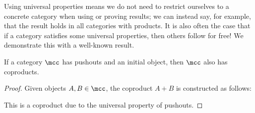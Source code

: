 Using universal properties means we do not need to restrict ourselves to a
concrete category when using or proving results; we can instead say, for
example, that the result holds in all categories with products.
It is also often the case that if a category satisfies some universal
properties, then others follow for free!
We demonstrate this with a well-known result.

\begin{lemma}
    \label{lem:coproducts-pushout}
    If a category \(\mcc\) has pushouts and an initial object, then \(\mcc\)
    also has coproducts.
\end{lemma}
\begin{proof}
    Given objects \(A,B \in \mcc\), the coproduct \(A + B\) is constructed as
    follows:
    \begin{center}
    \end{center}
    This is a coproduct due to the universal property of pushouts.
\end{proof}